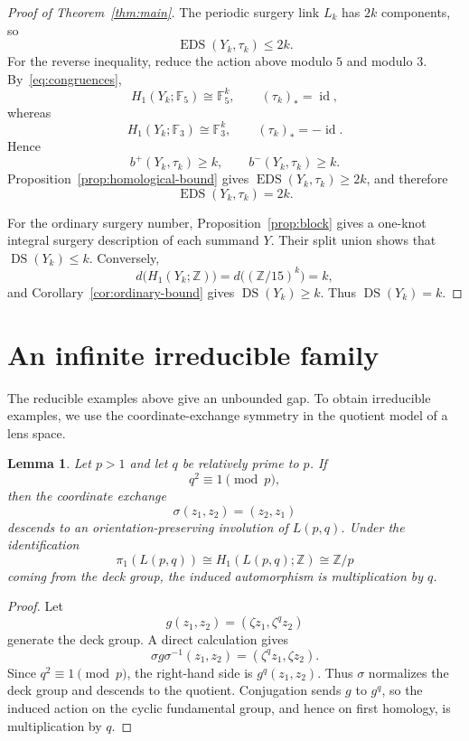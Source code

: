 \documentclass[11pt]{amsart}
\newcommand{\DS}{\operatorname{DS}}
\newcommand{\EDS}{\operatorname{EDS}}
\newcommand{\id}{\operatorname{id}}
\newcommand{\F}{\mathbb{F}}
\newcommand{\Z}{\mathbb{Z}}
\newtheorem{lemma}[theorem]{Lemma}
\theoremstyle{definition}
\theoremstyle{remark}
\begin{document}
\begin{proof}[Proof of Theorem~\ref{thm:main}]
The periodic surgery link $L_k$ has $2k$ components, so
\[
   \EDS(Y_k,\tau_k)\leq2k.
\]
For the reverse inequality, reduce the action above modulo $5$ and modulo $3$. By~\eqref{eq:congruences},
\[
   H_1(Y_k;\F_5)\cong\F_5^k,
   \qquad
   (\tau_k)_*=\id,
\]
whereas
\[
   H_1(Y_k;\F_3)\cong\F_3^k,
   \qquad
   (\tau_k)_*=-\id.
\]
Hence
\[
   b^+(Y_k,\tau_k)\geq k,
   \qquad
   b^-(Y_k,\tau_k)\geq k.
\]
Proposition~\ref{prop:homological-bound} gives $\EDS(Y_k,\tau_k)\geq2k$, and therefore
\[
   \EDS(Y_k,\tau_k)=2k.
\]

For the ordinary surgery number, Proposition~\ref{prop:block} gives a one-knot integral surgery description of each summand $Y$. Their split union shows that $\DS(Y_k)\leq k$. Conversely,
\[
   d\bigl(H_1(Y_k;\Z)\bigr)
   =d\bigl((\Z/15)^k\bigr)
   =k,
\]
and Corollary~\ref{cor:ordinary-bound} gives $\DS(Y_k)\geq k$. Thus $\DS(Y_k)=k$.
\end{proof}

\section{An infinite irreducible family}

The reducible examples above give an unbounded gap. To obtain irreducible examples, we use the coordinate-exchange symmetry in the quotient model of a lens space.

\begin{lemma}\label{lem:coordinate-exchange}
Let $p>1$ and let $q$ be relatively prime to $p$. If
\[
   q^2\equiv1\pmod p,
\]
then the coordinate exchange
\[
   \sigma(z_1,z_2)=(z_2,z_1)
\]
descends to an orientation-preserving involution of $L(p,q)$. Under the identification
\[
   \pi_1(L(p,q))\cong H_1(L(p,q);\Z)\cong\Z/p
\]
coming from the deck group, the induced automorphism is multiplication by $q$.
\end{lemma}

\begin{proof}
Let
\[
   g(z_1,z_2)=(\zeta z_1,\zeta^qz_2)
\]
generate the deck group. A direct calculation gives
\[
   \sigma g\sigma^{-1}(z_1,z_2)=(\zeta^qz_1,\zeta z_2).
\]
Since $q^2\equiv1\pmod p$, the right-hand side is $g^q(z_1,z_2)$. Thus $\sigma$ normalizes the deck group and descends to the quotient. Conjugation sends $g$ to $g^q$, so the induced action on the cyclic fundamental group, and hence on first homology, is multiplication by $q$.
\end{proof}
\end{document}
